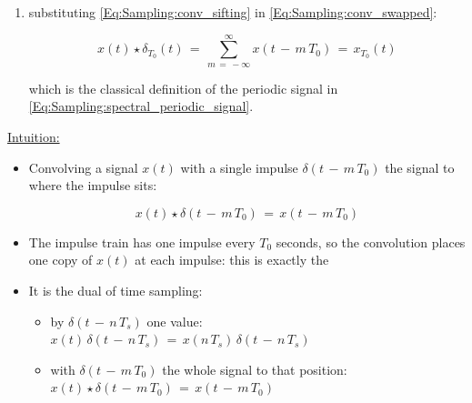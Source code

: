 \begin{enumerate}
\begin{equation}
\int_{-\infty}^{\infty} x(\lambda) \, \delta\big(\lambda \, - \, (t \, - \, m \, T_0)\big) \, d\lambda \, = \, x(t \, - \, m \, T_0)
\label{Eq:Sampling:conv_sifting}
\end{equation}

\item {} substituting \autoref{Eq:Sampling:conv_sifting} in \autoref{Eq:Sampling:conv_swapped}:

\begin{equation}
\boxed{
x(t) \star \delta_{T_0}(t) \, = \, \sum_{m \, = \, -\infty}^{\infty} x(t \, - \, m \, T_0) \, = \, x_{T_0}(t)
}
\label{Eq:Sampling:conv_result}
\end{equation}

which is the classical definition of the periodic signal in \autoref{Eq:Sampling:spectral_periodic_signal}.

\end{enumerate}

\underline{Intuition:}

\begin{itemize}

\item Convolving a signal $x(t)$ with a single impulse $\delta(t \, - \, m \, T_0)$  the signal to where the impulse sits:

\begin{equation}
x(t) \star \delta(t \, - \, m \, T_0) \, = \, x(t \, - \, m \, T_0)
\end{equation}

\item The impulse train has one impulse every $T_0$ seconds, so the convolution places one copy of $x(t)$ at each impulse: this is exactly the 

\item It is the dual of time sampling:

	\begin{itemize}
	\item {} by $\delta(t \, - \, n \, T_s)$  one value: $x(t) \, \delta(t \, - \, n \, T_s) \, = \, x(n \, T_s) \, \delta(t \, - \, n \, T_s)$

	\item {} with $\delta(t \, - \, m \, T_0)$  the whole signal to that position: $x(t) \star \delta(t \, - \, m \, T_0) \, = \, x(t \, - \, m \, T_0)$
	\end{itemize}

\end{itemize}


